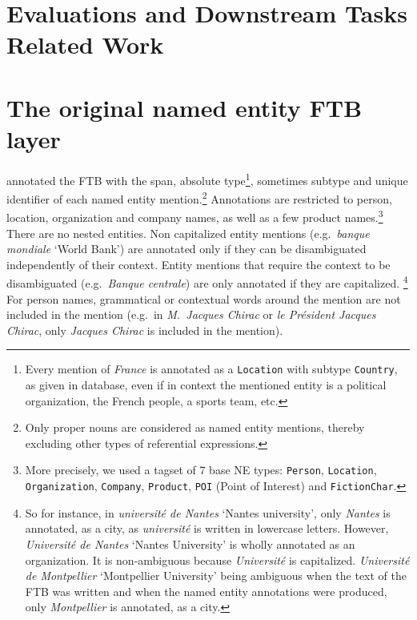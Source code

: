 \section{Evaluations and Downstream Tasks Related Work}

\section{The original named entity FTB layer}
\label{subsec:originalannotations}


 annotated the FTB with the span, absolute type\footnote{
    Every mention of \emph{France} is annotated as a \texttt{Location} with subtype \texttt{Country}, as given in \aleda database, even if in context the mentioned entity is a political organization, the French people, a sports team, etc.}, sometimes subtype and \aleda unique identifier of each named entity mention.\footnote{Only proper nouns are considered as named entity mentions, thereby excluding other types of referential expressions.} Annotations are restricted to person, location, organization and company names, as well as a few product names.\footnote{More precisely, we used a tagset of 7 base NE types: \texttt{Person}, \texttt{Location}, \texttt{Organization}, \texttt{Company}, \texttt{Product}, \texttt{POI} (Point of Interest) and \texttt{FictionChar}.} There are no nested entities. Non capitalized entity mentions (e.g.~\emph{banque mondiale} `World Bank') are annotated only if they can be disambiguated independently of their context. Entity mentions that require the context to be disambiguated (e.g.~\emph{Banque centrale}) are only annotated if they are capitalized.
\footnote{So for instance, in \emph{université de Nantes} `Nantes university', only \emph{Nantes} is annotated, as a city, as \emph{université} is written in lowercase letters. However, \emph{Université de Nantes} `Nantes University' is wholly annotated as an organization. It is non-ambiguous because \emph{Université} is capitalized. \emph{Université de Montpellier} `Montpellier University' being ambiguous when the text of the FTB was written and when the named entity annotations were produced, only \emph{Montpellier} is annotated, as a city.}
For person names, grammatical or contextual words around the mention are not included in the mention (e.g.~in \emph{M.~Jacques Chirac} or \emph{le Président Jacques Chirac}, only \emph{Jacques Chirac} is included in the mention).


